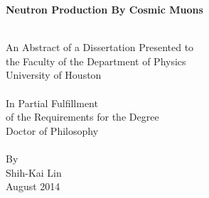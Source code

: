 \begin{center}



\begin{description}
\bigskip
\bigskip
\bigskip
\bigskip
\bigskip
\end{description}

{ \huge \bfseries Neutron Production By Cosmic Muons \\[0.4cm] }

\HRule \\[1.0cm]

An Abstract of a Dissertation Presented to\\
the Faculty of the Department of Physics\\
University of Houston\\[1.0cm]

\HRule \\[1.0cm]

In Partial Fulfillment\\
of the Requirements for the Degree\\
Doctor of Philosophy\\[1.0cm]

\HRule \\[1.0cm]

By\\
Shih-Kai Lin\\
August 2014




\end{center}